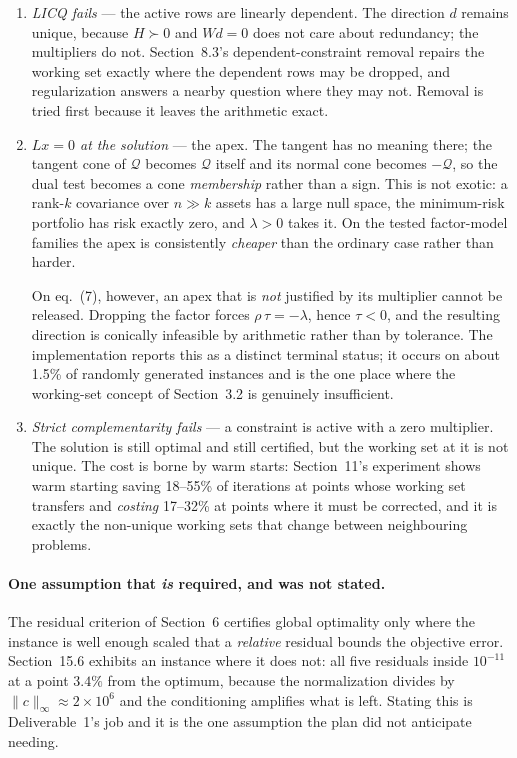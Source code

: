 \documentclass[11pt,a4paper]{article}
\begin{document}
\begin{enumerate}
    \item \emph{LICQ fails} --- the active rows are linearly
    dependent. The direction $d$ remains unique, because $H\succ0$ and
    $Wd=0$ does not care about redundancy; the multipliers do not.
    Section~8.3's dependent-constraint removal repairs the working set
    exactly where the dependent rows may be dropped, and regularization
    answers a nearby question where they may not. Removal is tried
    first because it leaves the arithmetic exact.

    \item \emph{$Lx=0$ at the solution} --- the apex. The tangent has
    no meaning there; the tangent cone of $\mathcal Q$ becomes
    $\mathcal Q$ itself and its normal cone becomes $-\mathcal Q$, so
    the dual test becomes a cone \emph{membership} rather than a sign.
    This is not exotic: a rank-$k$ covariance over $n\gg k$ assets has
    a large null space, the minimum-risk portfolio has risk exactly
    zero, and $\lambda>0$ takes it. On the tested factor-model
    families the apex is consistently \emph{cheaper} than the ordinary
    case rather than harder.

    On eq.~(7), however, an apex that is \emph{not} justified by its
    multiplier cannot be released. Dropping the factor forces
    $\rho\,\tau=-\lambda$, hence $\tau<0$, and the resulting direction
    is conically infeasible by arithmetic rather than by tolerance.
    The implementation reports this as a distinct terminal status; it
    occurs on about 1.5\% of randomly generated instances and is the
    one place where the working-set concept of Section~3.2 is
    genuinely insufficient.

    \item \emph{Strict complementarity fails} --- a constraint is
    active with a zero multiplier. The solution is still optimal and
    still certified, but the working set at it is not unique. The cost
    is borne by warm starts: Section~11's experiment shows warm
    starting saving 18--55\% of iterations at points whose working set
    transfers and \emph{costing} 17--32\% at points where it must be
    corrected, and it is exactly the non-unique working sets that
    change between neighbouring problems.
\end{enumerate}

\paragraph{One assumption that \emph{is} required, and was not stated.}
The residual criterion of Section~6 certifies global optimality only
where the instance is well enough scaled that a \emph{relative}
residual bounds the objective error. Section~15.6 exhibits an instance
where it does not: all five residuals inside $10^{-11}$ at a point
$3.4\%$ from the optimum, because the normalization divides by
$\|c\|_\infty\approx2\times10^{6}$ and the conditioning amplifies what
is left. Stating this is Deliverable~1's job and it is the one
assumption the plan did not anticipate needing.
\end{document}
